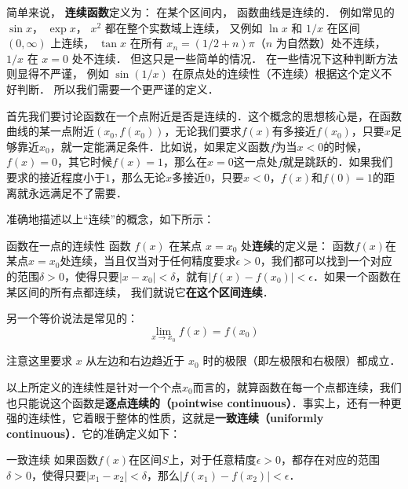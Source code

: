 

简单来说， \textbf{连续函数}定义为： 在某个区间内， 函数曲线是连续的． 例如常见的 $\sin x$， $\exp x$， $x^2$ 都在整个实数域上连续， 又例如 $\ln x$ 和 $1/x$ 在区间 $(0, \infty)$ 上连续， $\tan x$ 在所有 $x_n = (1/2 + n)\pi$（$n$ 为自然数）处不连续， $1/x$ 在 $x = 0$ 处不连续． 但这只是一些简单的情况． 在一些情况下这种判断方法则显得不严谨， 例如 $\sin(1/x)$ 在原点处的连续性（不连续）根据这个定义不好判断． 所以我们需要一个更严谨的定义．

首先我们要讨论函数在一个点附近是否是连续的．这个概念的思想核心是，在函数曲线的某一点附近$(x_0, f(x_0))$，无论我们要求$f(x)$有多接近$f(x_0)$，只要$x$足够靠近$x_0$，就一定能满足条件．比如说，如果定义函数$f$为当$x<0$的时候，$f(x)=0$，其它时候$f(x)=1$，那么在$x=0$这一点处$f$就是跳跃的．如果我们要求的接近程度小于$1$，那么无论$x$多接近$0$，只要$x<0$，$f(x)$和$f(0)=1$的距离就永远满足不了需要．

准确地描述以上“连续”的概念，如下所示：

\begin{definition}{函数在一点的连续性}
函数 $f(x)$ 在某点 $x = x_0$ 处\textbf{连续}的定义是： 函数$f(x)$在某点$x=x_0$处连续，当且仅当对于任何精度要求$\epsilon>0$，我们都可以找到一个对应的范围$\delta>0$，使得只要$|x-x_0|<\delta$，就有$|f(x)-f(x_0)|<\epsilon$．如果一个函数在某区间的所有点都连续， 我们就说它\textbf{在这个区间连续}．

另一个等价说法是常见的：
\begin{equation}
\lim_{x \to x_0} f(x) = f(x_0)
\end{equation}
\end{definition}

注意这里要求 $x$ 从左边和右边趋近于 $x_0$ 时的极限（即左极限和右极限）都成立． %

以上所定义的连续性是针对一个个点$x_0$而言的，就算函数在每一个点都连续，我们也只能说这个函数是\textbf{逐点连续的（pointwise continuous）}．事实上，还有一种更强的连续性，它着眼于整体的性质，这就是\textbf{一致连续（uniformly continuous）}．它的准确定义如下：

\begin{definition}{一致连续}
如果函数$f(x)$在区间$S$上，对于任意精度$\epsilon>0$，都存在对应的范围$\delta>0$，使得只要$|x_1-x_2|<\delta$，那么$|f(x_1)-f(x_2)|<\epsilon$．

\end{definition}

